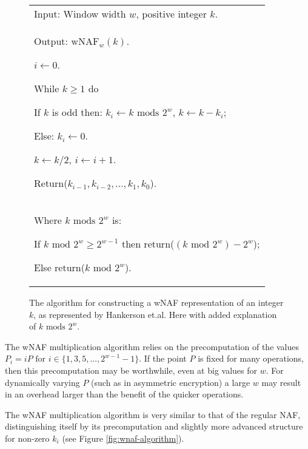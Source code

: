 \begin{figure}[htb!]
	\begin{tabular}{|p{\textwidth}|}
		\hline
		Input: Window width \(w\), positive integer \(k\). \\
		Output: \(\text{wNAF}_w(k)\).
		\begin{enumerate*}
			\item \(i \gets 0\).
			\item While \(k \geq 1\) do
			\begin{enumerate*}
				\item If \(k\) is odd then: \(k_i \gets k \text{ mods } 2^w\), \(k \gets k - k_i\);
				\item Else: \(k_i \gets 0\).
				\item \(k \gets k/2\), \(i \gets i + 1\).
			\end{enumerate*}
			\item Return(\(k_{i-1},k_{i-2},...,k_1,k_0\)).
		\end{enumerate*} \\
		\hline
		Where \(k \text{ mods } 2^w\) is: 
		\begin{enumerate*}
			\item If \(k \text{ mod } 2^w \geq 2^{w-1}\) then return(\((k \text{ mod } 2^w) - 2^w\));
			\item Else return(\(k \text{ mod } 2^w\)).
		\end{enumerate*} \\
		\hline
	\end{tabular}
	\caption{The algorithm for constructing a wNAF representation of an integer \(k\), as represented by Hankerson
		et.al.\cite{hankerson2010} Here with added explanation of \(k \text{ mods } 2^w\).}
	\label{fig:compute-wnaf-algorithm}
\end{figure}

The wNAF multiplication algorithm relies on the precomputation of the values \(P_i = iP \text{ for } i \in \{1,3,5,...,2^{w-1}-1\}\). If the
point \(P\) is fixed for many operations, then this precomputation may be worthwhile, even at big values for \(w\). For dynamically varying
\(P\) (such as in asymmetric encryption) a large \(w\) may result in an overhead larger than the benefit of the quicker operations.

The wNAF multiplication algorithm is very similar to that of the regular NAF, distinguishing itself by its precomputation and slightly more
advanced structure for non-zero \(k_i\) (see Figure \ref{fig:wnaf-algorithm}).

